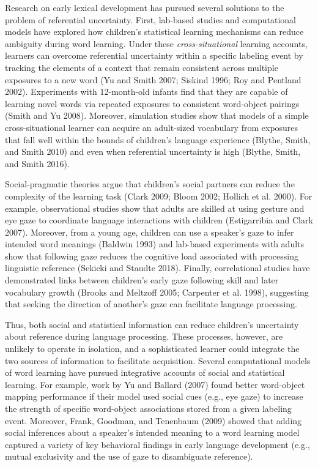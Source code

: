 \documentclass[10pt, letterpaper]{article}
\begin{document}
Research on early lexical development has pursued several solutions to
the problem of referential uncertainty. First, lab-based studies and
computational models have explored how children's statistical learning
mechanisms can reduce ambiguity during word learning. Under these
\emph{cross-situational} learning accounts, learners can overcome
referential uncertainty within a specific labeling event by tracking the
elements of a context that remain consistent across multiple exposures
to a new word (Yu and Smith 2007; Siskind 1996; Roy and Pentland 2002).
Experiments with 12-month-old infants find that they are capable of
learning novel words via repeated exposures to consistent word-object
pairings (Smith and Yu 2008). Moreover, simulation studies show that
models of a simple cross-situational learner can acquire an adult-sized
vocabulary from exposures that fall well within the bounds of children's
language experience (Blythe, Smith, and Smith 2010) and even when
referential uncertainty is high (Blythe, Smith, and Smith 2016).

Social-pragmatic theories argue that children's social partners can
reduce the complexity of the learning task (Clark 2009; Bloom 2002;
Hollich et al. 2000). For example, observational studies show that
adults are skilled at using gesture and eye gaze to coordinate language
interactions with children (Estigarribia and Clark 2007). Moreover, from
a young age, children can use a speaker's gaze to infer intended word
meanings (Baldwin 1993) and lab-based experiments with adults show that
following gaze reduces the cognitive load associated with processing
linguistic reference (Sekicki and Staudte 2018). Finally, correlational
studies have demonstrated links between children's early gaze following
skill and later vocabulary growth (Brooks and Meltzoff 2005; Carpenter
et al. 1998), suggesting that seeking the direction of another's gaze
can facilitate language processing.

Thus, both social and statistical information can reduce children's
uncertainty about reference during language processing. These processes,
however, are unlikely to operate in isolation, and a sophisticated
learner could integrate the two sources of information to facilitate
acquisition. Several computational models of word learning have pursued
integrative accounts of social and statistical learning. For example,
work by Yu and Ballard (2007) found better word-object mapping
performance if their model used social cues (e.g., eye gaze) to increase
the strength of specific word-object associations stored from a given
labeling event. Moreover, Frank, Goodman, and Tenenbaum (2009) showed
that adding social inferences about a speaker's intended meaning to a
word learning model captured a variety of key behavioral findings in
early language development (e.g., mutual exclusivity and the use of gaze
to disambiguate reference).
\end{document}
